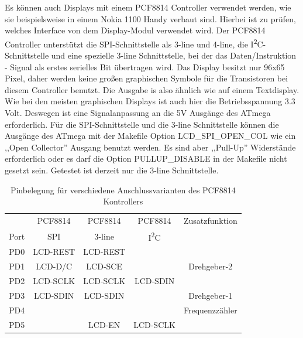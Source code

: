 Es können auch Displays mit einem PCF8814 Controller verwendet werden, wie sie beispielsweise
in einem Nokia 1100 Handy verbaut sind. Hierbei ist zu prüfen, welches Interface von dem Display-Modul
verwendet wird. Der PCF8814 Controller unterstützt die SPI-Schnittstelle als 3-line und 4-line,
die I\textsuperscript{2}C-Schnittstelle und eine spezielle 3-line Schnittstelle, bei der das
Daten/Instruktion - Signal als erstes serielles Bit übertragen wird.
Das Display besitzt nur 96x65 Pixel, daher werden keine großen graphischen Symbole für die
Transistoren bei diesem Controller benutzt. Die Ausgabe is also ähnlich wie auf einem Textdisplay.
Wie bei den meisten graphischen Displays ist auch hier die Betriebsspannung 3.3 Volt.
Deswegen ist eine Signalanpassung an die 5V Ausgänge des ATmega erforderlich.
Für die SPI-Schnittstelle und die 3-line Schnittstelle können die Ausgänge des ATmega
mit der Makefile Option LCD\_SPI\_OPEN\_COL wie ein ,,Open Collector'' Ausgang benutzt werden.
Es sind aber ,,Pull-Up'' Widerstände erforderlich oder es darf die Option PULLUP\_DISABLE
in der Makefile nicht gesetzt sein.
Getestet ist derzeit nur die 3-line Schnittstelle.

\begin{table}[H]
  \begin{center}
    \begin{tabular}{| c || c | c | c | c |}
    \hline
           &  PCF8814    & PCF8814        & PCF8814     & Zusatzfunktion \\
      Port &    SPI      & 3-line         &   I\textsuperscript{2}C      & \\
    \hline
    \hline
    PD0    &   LCD-REST  & LCD-REST       &            & \\
    \hline
    PD1    &   LCD-D/C   & LCD-SCE        &             & Drehgeber-2 \\
    \hline
    PD2    &   LCD-SCLK  & LCD-SCLK       &  LCD-SDIN   & \\
    \hline
    PD3    &   LCD-SDIN  & LCD-SDIN       &             & Drehgeber-1 \\
    \hline
    PD4    &             &                &             & Frequenzzähler \\
    \hline
    PD5    &             & LCD-EN         &   LCD-SCLK  & \\
    \hline
    \end{tabular}
  \end{center}
  \caption{Pinbelegung für verschiedene Anschlussvarianten des PCF8814 Kontrollers}
  \label{tab:PCF8814-con}
\end{table}

